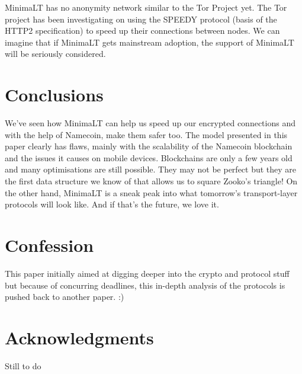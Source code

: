 \documentclass{vldb}
\begin{document}
MinimaLT has no anonymity network similar to the Tor Project yet. The Tor project has been investigating on using the SPEEDY protocol (basis of the HTTP2 specification) to speed up their connections between nodes. We can imagine that if MinimaLT gets mainstream adoption, the support of MinimaLT will be seriously considered.

\section{Conclusions}

We've seen how MinimaLT can help us speed up our encrypted connections and with the help of Namecoin, make them safer too. The model presented in this paper clearly has flaws, mainly with the scalability of the Namecoin blockchain and the issues it causes on mobile devices. Blockchains are only a few years old and many optimisations are still possible. They may not be perfect but they are the first data structure we know of that allows us to square Zooko's triangle! On the other hand, MinimaLT is a sneak peak into what tomorrow's transport-layer protocols will look like. And if that's the future, we love it. 

\balance

\section{Confession}

This paper initially aimed at digging deeper into the crypto and protocol stuff but because of concurring deadlines, this in-depth analysis of the protocols is pushed back to another paper. :) 

\section{Acknowledgments}

Still to do 


\end{document}
